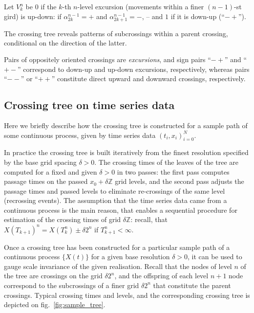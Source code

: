 \documentclass[a4paper]{article}
\begin{document}
Let $V_k^n$ be $0$ if the $k$-th $n$-level excursion (movements within a finer $(n-1)$-st
gird) is up-down: if $\alpha_{2k}^{n-1} = +$ and $\alpha_{2k+1}^{n-1} = -$, --
and $1$ if it is down-up (``$-+$'').

The crossing tree reveals patterns of subcrossings within a parent crossing,
conditional on the direction of the latter.

Pairs of oppositely oriented crossings are
\emph{excursions}, and sign pairs ``$-+$'' and ``$+-$'' correspond to down-up
and up-down excursions, respectively, whereas pairs ``$--$'' or ``$++$'' constitute
direct upward and downward crossings, respectively.


\subsection{Crossing tree on time series data} %
\label{sub:crossing_tree_on_time_series_data}

Here we briefly describe how the crossing tree is constructed for a sample
path of some continuous process, given by time series data $(t_i, x_i)_{i=0}^N$.

In practice the crossing tree is built iteratively from the finest resolution
specified by the base grid spacing $\delta > 0$. The crossing times of the leaves
of the tree are computed for a fixed and given $\delta>0$ in two passes: the first
pass computes passage times on the passed $x_0+\delta \mathbb{Z}$ grid levels, and
the second pass adjusts the passage times and passed levels to eliminate re-crossings
of the same level (recrossing events). The assumption that the time series data
came from a continuous process is the main reason, that enables a sequential procedure
for estimation of the crossing times of grid $\delta\mathbb{Z}$: recall, that
$X(T_{k+1})^n = X(T_k^n) \pm\delta2^n$ if $T_{k+1}^n<\infty$.

Once a crossing tree has been constructed for a particular sample path of a continuous
process $\{X(t)\}$ for a given base resolution $\delta>0$, it can be used to gauge
scale invariance of the given realisation. Recall that the nodes of level $n$ of
the tree are crossings on the grid $\delta 2^n$, and the offspring of each level
$n+1$ node correspond to the subcrossings of a finer grid $\delta 2^n$ that constitute
the parent crossings. Typical crossing times and levels, and the corresponding crossing
tree is depicted on fig.~\ref{fig:sample_tree}.
\end{document}
